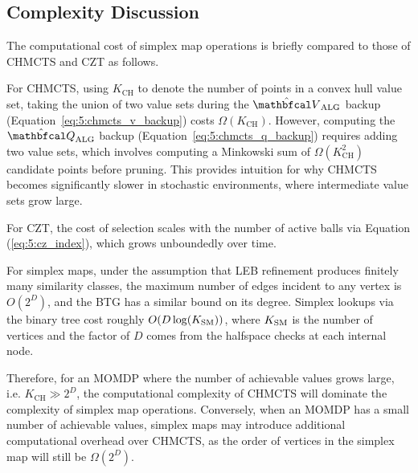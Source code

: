\subsection{Complexity Discussion}
\label{sec:6-2-3-complexity}

    The computational cost of simplex map operations is briefly compared to those of CHMCTS and CZT as follows.

    For CHMCTS, using $K_{\text{CH}}$ to denote the number of points 
    in a convex hull value set, taking the union of two 
    value sets during the $\Valg$ backup 
    (Equation~\ref{eq:5:chmcts_v_backup}) costs $\Omega(K_{\text{CH}})$. 
    However, computing the $\Qalg$ backup 
    (Equation~\ref{eq:5:chmcts_q_backup}) requires adding 
    two value sets, which involves computing a Minkowski 
    sum of $\Omega(K_{\text{CH}}^2)$ candidate points before pruning. 
    This provides intuition for why CHMCTS becomes 
    significantly slower in stochastic environments, where 
    intermediate value sets grow large.

    For CZT, the cost of selection scales with the number of active balls via Equation (\ref{eq:5:cz_index}), which grows unboundedly over time.

    For simplex maps, under the assumption that LEB 
    refinement produces finitely many similarity classes, 
    the maximum number of edges incident to any vertex 
    is $O(2^D)$, and the BTG has a similar bound on its 
    degree. Simplex lookups via the binary tree cost roughly 
    $O(D\log(K_{{\textnormal{SM}}}))$, where $K_{{\textnormal{SM}}}$ is the number of vertices 
    and the factor of $D$ comes from the halfspace checks 
    at each internal node.

    Therefore, for an MOMDP where the number of achievable values grows large, i.e. $K_{\text{CH}}\gg 2^D$, the computational complexity of CHMCTS will dominate the complexity of simplex map operations. Conversely, when an MOMDP has a small number of achievable values, simplex maps may introduce additional computational overhead over CHMCTS, as the order of vertices in the simplex map will still be $\Omega(2^D)$.


















